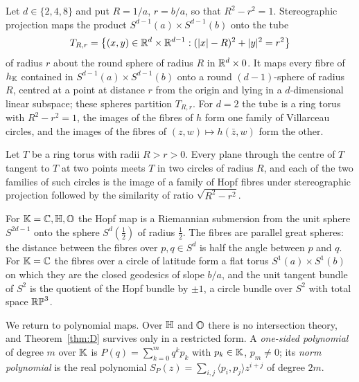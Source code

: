 \begin{maintheorem}\label{thm:E}
Let $d\in\{2,4,8\}$ and put $R=1/a$, $r=b/a$, so that $R^2-r^2=1$. Stereographic projection maps the product $S^{d-1}(a)\times S^{d-1}(b)$ onto the tube
\[
T_{R,r}=\bigl\{(x,y)\in\mathbb{R}^d\times\mathbb{R}^{d-1}:(|x|-R)^2+|y|^2=r^2\bigr\}
\]
of radius $r$ about the round sphere of radius $R$ in $\mathbb{R}^d\times0$. It maps every fibre of $h_{\mathbb{K}}$ contained in $S^{d-1}(a)\times S^{d-1}(b)$ onto a round $(d-1)$-sphere of radius $R$, centred at a point at distance $r$ from the origin and lying in a $d$-dimensional linear subspace; these spheres partition $T_{R,r}$. For $d=2$ the tube is a ring torus with $R^2-r^2=1$, the images of the fibres of $h$ form one family of Villarceau circles, and the images of the fibres of $(z,w)\mapsto h(\bar z,w)$ form the other.
\end{maintheorem}

\begin{corollary}\label{cor:intro-villarceau}
Let $T$ be a ring torus with radii $R>r>0$. Every plane through the centre of $T$ tangent to $T$ at two points meets $T$ in two circles of radius $R$, and each of the two families of such circles is the image of a family of Hopf fibres under stereographic projection followed by the similarity of ratio $\sqrt{R^2-r^2}$.
\end{corollary}

\begin{maintheorem}\label{thm:F}
For $\mathbb{K}=\mathbb{C},\mathbb{H},\mathbb{O}$ the Hopf map is a Riemannian submersion from the unit sphere $S^{2d-1}$ onto the sphere $S^d(\tfrac12)$ of radius $\tfrac12$. The fibres are parallel great spheres: the distance between the fibres over $p,q\in S^d$ is half the angle between $p$ and $q$. For $\mathbb{K}=\mathbb{C}$ the fibres over a circle of latitude form a flat torus $S^1(a)\times S^1(b)$ on which they are the closed geodesics of slope $b/a$, and the unit tangent bundle of $S^2$ is the quotient of the Hopf bundle by $\pm1$, a circle bundle over $S^2$ with total space $\mathbb{RP}^3$.
\end{maintheorem}

We return to polynomial maps. Over $\mathbb{H}$ and $\mathbb{O}$ there is no intersection theory, and Theorem~\ref{thm:D} survives only in a restricted form. A \emph{one-sided polynomial} of degree $m$ over $\mathbb{K}$ is $P(q)=\sum_{k=0}^mq^kp_k$ with $p_k\in\mathbb{K}$, $p_m\neq0$; its \emph{norm polynomial} is the real polynomial $S_P(z)=\sum_{i,j}\langle p_i,p_j\rangle z^{i+j}$ of degree $2m$.

